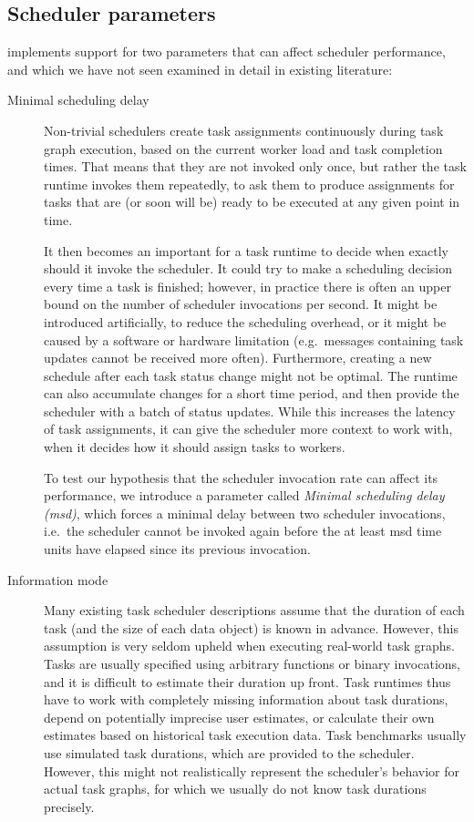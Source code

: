 \subsection{Scheduler parameters}
\estee{} implements support for two parameters that can affect scheduler
performance, and which we have not seen examined in detail in existing literature:
\begin{description}
	\item[Minimal scheduling delay] Non-trivial schedulers create task assignments continuously during task graph execution, based on
		the current worker load and task completion times. That means that they are not invoked only once,
		but rather the task runtime invokes them repeatedly, to ask them to produce assignments for tasks
		that are (or soon will be) ready to be executed at any given point in time.

		It then becomes an important for a task runtime to decide when exactly should it invoke the
		scheduler. It could try to make a scheduling decision every time a task is finished; however, in
		practice there is often an upper bound on the number of scheduler invocations per second. It might
		be introduced artificially, to reduce the scheduling overhead, or it might be caused by a software
		or hardware limitation (e.g.\ messages containing task updates cannot be received more often).
		Furthermore, creating a new schedule after each task status change might not be optimal. The
		runtime can also accumulate changes for a short time period, and then provide the scheduler with a
		batch of status updates. While this increases the latency of task assignments, it can give the
		scheduler more context to work with, when it decides how it should assign tasks to workers.

		To test our hypothesis that the scheduler invocation rate can affect its performance, we introduce
		a parameter called \emph{Minimal scheduling delay (\acrshort{msd})}, which forces a minimal delay between two scheduler
		invocations, i.e.\ the scheduler cannot be invoked again before the at least
		\gls{msd} time units have elapsed since its previous invocation.
	\item[Information mode] Many existing task scheduler descriptions assume that the duration of each task (and the size of
		each data object) is known in advance. However, this assumption is very seldom upheld when
		executing real-world task graphs. Tasks are usually specified using arbitrary functions or binary
		invocations, and it is difficult to estimate their duration up front. Task runtimes thus have to
		work with completely missing information about task durations, depend on potentially imprecise user
		estimates, or calculate their own estimates based on historical task execution data. Task
		benchmarks usually use simulated task durations, which are provided to the scheduler. However, this
		might not realistically represent the scheduler's behavior for actual task graphs, for which we
		usually do not know task durations precisely.


\end{description}
